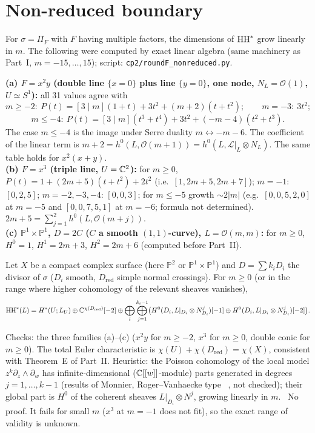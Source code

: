 \section{Non-reduced boundary}\label{p3:sec:nonred}
For $\sigma=\Pi_F$ with $F$ having multiple factors, the dimensions of $\mathrm{HH}^*$ grow linearly in $m$. The following were computed by exact linear algebra (same machinery as Part~I, $m=-15,\dots,15$); script: \texttt{cp2/roundF\_nonreduced.py}.
\begin{obs}\tV\label{p3:obs:nr}
\textbf{(a) $F=x^2y$ (double line $\{x=0\}$ plus line $\{y=0\}$, one node, $N_L=\mathcal O(1)$, $U\simeq S^1$):} all 31 values agree with
\[m\ge-2:\ P(t)=[3\mid m](1+t)+3t^2+(m+2)(t+t^2);\qquad m=-3:\ 3t^2;\]
\[m\le-4:\ P(t)=[3\mid m](t^3+t^4)+3t^2+(-m-4)(t^2+t^3).\]
The case $m\le-4$ is the image under Serre duality $m\leftrightarrow-m-6$. The coefficient of the linear term is $m+2=h^0(L,\mathcal O(m+1))=h^0(L,\mathcal L|_L\otimes N_L)$. The same table holds for $x^2(x+y)$.\\
\textbf{(b) $F=x^3$ (triple line, $U=\mathbb C^2$):} for $m\ge0$, $P(t)=1+(2m+5)(t+t^2)+2t^2$ (i.e.\ $[1,2m+5,2m+7]$); $m=-1$: $[0,2,5]$; $m=-2,-3,-4$: $[0,0,3]$; for $m\le-5$ growth $\sim2|m|$ (e.g.\ $[0,0,5,2,0]$ at $m=-5$ and $[0,0,7,5,1]$ at $m=-6$; formula not determined). $2m+5=\sum_{j=1}^2h^0(L,\mathcal O(m+j))$.\\
\textbf{(c) $\mathbb P^1\times\mathbb P^1$, $D=2C$ ($C$ a smooth $(1,1)$-curve), $L=\mathcal O(m,m)$:} for $m\ge0$, $H^0=1$, $H^1=2m+3$, $H^2=2m+6$ (computed before Part~II).
\end{obs}
\begin{conj}\tK\label{p3:conj:NR}
Let $X$ be a compact complex surface (here $\mathbb P^2$ or $\mathbb P^1\times\mathbb P^1$) and $D=\sum k_iD_i$ the divisor of $\sigma$ ($D_i$ smooth, $D_{\mathrm{red}}$ simple normal crossings). For $m\ge0$ (or in the range where higher cohomology of the relevant sheaves vanishes),
\[\mathrm{HH}^*(L)=H^*(U;L_U)\oplus\mathbb C^{\chi(D_{\mathrm{red}})}[-2]\oplus\bigoplus_i\bigoplus_{j=1}^{k_i-1}\bigl(H^0(D_i,L|_{D_i}\otimes N_{D_i}^{j})[-1]\oplus H^0(D_i,L|_{D_i}\otimes N_{D_i}^{j})[-2]\bigr).\]
\end{conj}
\noindent Checks: the three families (a)--(c) ($x^2y$ for $m\ge-2$, $x^3$ for $m\ge0$, double conic for $m\ge0$). The total Euler characteristic is $\chi(U)+\chi(D_{\mathrm{red}})=\chi(X)$, consistent with Theorem~E of Part~II. Heuristic: the Poisson cohomology of the local model $z^k\partial_z\wedge\partial_w$ has infinite-dimensional ($\mathbb C[[w]]$-module) parts generated in degrees $j=1,\dots,k-1$ (results of Monnier, Roger--Vanhaecke type \tC\ \tQ, not checked); their global part is $H^0$ of the coherent sheaves $L|_{D_i}\otimes N^j$, growing linearly in $m$. \tK\ No proof. It fails for small $m$ ($x^3$ at $m=-1$ does not fit), so the exact range of validity is unknown.

